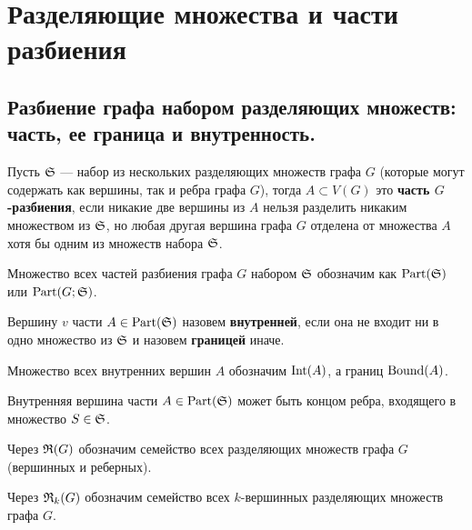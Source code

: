 \newpage

\setcounter{section}{-1}
\section{Разделяющие множества и части разбиения}

\subsection{Разбиение графа набором разделяющих множеств: часть, ее граница и внутренность.}

\begin{df*}
	Пусть $\S$ — набор из нескольких разделяющих множеств графа $G$ (которые могут содержать как вершины, так и ребра графа $G$), тогда $A \subset V(G)$ это \textbf{часть $G$-разбиения}, если никакие две вершины из $A$ нельзя разделить никаким множеством из $\S$, но любая другая вершина графа $G$ отделена от множества $A$ хотя бы одним из множеств набора $\S$. 
\end{df*}

\begin{prop*}
	Множество всех частей разбиения графа $G$ набором $\S$ обозначим как $\Part(\S)$ или $\Part(G; \S)$.
\end{prop*}

\begin{df*}
	Вершину $v$ части $A \in \Part(\S)$ назовем \textbf{внутренней}, если она не входит ни в одно множество из $\S$ и назовем \textbf{границей} иначе.

	Множество всех внутренних вершин $A$ обозначим $\Int(A)$, а границ $\Bound(A)$.

	Внутренняя вершина части $A \in \Part(\S)$ может быть концом ребра, входящего в множество  $S \in \S$.
\end{df*}

\begin{prop*}
	Через $\R(G)$ обозначим семейство всех разделяющих множеств графа $G$(вершинных и реберных).

	Через $\R_k(G)$ обозначим семейство всех $k$-вершинных разделяющих множеств графа $G$.
\end{prop*}

